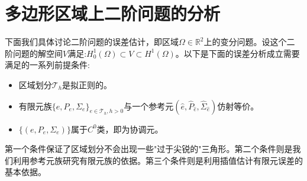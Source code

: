 \section{多边形区域上二阶问题的分析}
下面我们具体讨论二阶问题的误差估计，即区域$\Omega\in\mathbb{R}^{2}$上的变分问题。设这个二阶问题的解空间$V$满足:$H_{0}^{1}(\Omega)\subset V\subset H^{1}(\Omega)$。以下是下面的误差分析成立需要满足的一系列前提条件:
\begin{itemize}
    \item 区域划分$\mathcal{T}_{h}$是拟正则的。
    \item 有限元族$\{e,P_{e},\Sigma_{e}\}_{e\in\mathcal{T}_{h},h>0}$与一个参考元$(\hat{e},\hat{P}_{\hat{e}},\hat{\Sigma}_{\hat{e}})$仿射等价。
    \item $\{(e,P_{e},\Sigma_{e})\}$属于$C^{0}$类，即为协调元。 
\end{itemize}
\begin{remark}
    第一个条件保证了区域划分不会出现一些"过于尖锐的"三角形。第二个条件则是我们利用参考元族研究有限元族的依据。第三个条件则是利用插值估计有限元误差的基本依据。
\end{remark}

